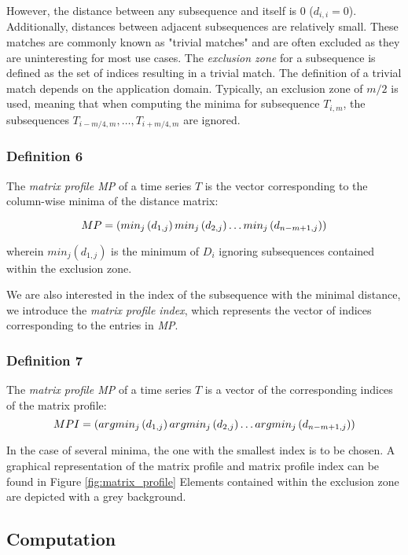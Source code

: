 However, the distance between any subsequence and itself is 0 (\(d_{i,i} = 0\)). Additionally, distances between adjacent subsequences are relatively small. These matches are commonly known as "trivial matches" and are often excluded as they are uninteresting for most use cases. The \textit{exclusion zone} for a subsequence is defined as the set of indices resulting in a trivial match. The definition of a trivial match depends on the application domain. Typically, an exclusion zone of \(m/2\) is used, meaning that when computing the minima for subsequence \(T_{i,m}\), the subsequences \(T_{i-m/4,m}, \ldots, T_{i+m/4,m}\) are ignored.


\subsubsection{Definition 6} The \textit{matrix profile MP} of a time series $T$ is the vector corresponding to the column-wise minima of the distance matrix:

\[
    MP = \left(min_j\left(d_{1,j}\right) \space min_j\left(d_{2,j}\right) \dots min_j\left(d_{n-m+1,j}\right)\right)
\]

wherein \(min_j\left(d_{1,j}\right)\) is the minimum of $D_i$ ignoring subsequences contained within the exclusion zone.

We are also interested in the index of the subsequence with the minimal distance, we introduce the \textit{matrix profile index}, which represents the vector of indices corresponding to the entries in \textit{MP}.

\subsubsection{Definition 7} The \textit{matrix profile MP} of a time series $T$ is a vector of the corresponding indices of the matrix profile:
\[
    MPI = \left(argmin_j\left(d_{1,j}\right) \space argmin_j\left(d_{2,j}\right) \dots argmin_j\left(d_{n-m+1,j}\right)\right)
\]

In the case of several minima, the one with the smallest index is to be chosen. A graphical representation of the matrix profile and matrix profile index can be found in Figure \ref{fig:matrix_profile} Elements contained within the exclusion zone are depicted with a grey background.

\subsection{Computation} \label{subsection:computation}

